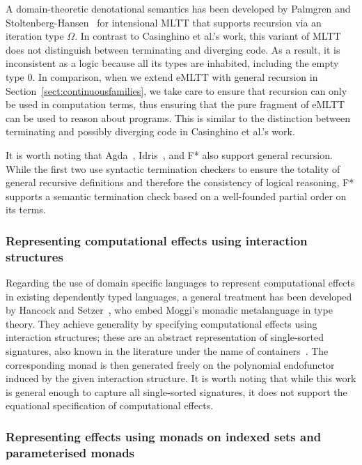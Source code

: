 A domain-theoretic denotational semantics has been developed by Palmgren and Stoltenberg-Hansen~\cite{Palmgren:DomainInterpretation} for intensional MLTT that supports recursion via an iteration type $\Omega$. In contrast to Casinghino et al.'s work, this variant of MLTT  does not distinguish between terminating and diverging code. As a result, it is inconsistent as a logic because all its types are inhabited, including the empty type $0$.
% 
In comparison, when we extend eMLTT with general recursion in Section~\ref{sect:continuousfamilies}, 
we take care to ensure that recursion can only be used in computation terms, thus ensuring that the pure fragment of eMLTT can be used to reason about programs. This is similar to the distinction between terminating and possibly diverging code in Casinghino et al.'s work.

It is worth noting that Agda~\cite{Norell:Thesis}, Idris~\cite{Brady:Idris}, and F* also support general recursion. 
While the first two use syntactic termination checkers to ensure the totality of general recursive definitions and therefore the consistency of logical reasoning, F* supports a semantic termination check based on a well-founded partial order on its terms. 


\subsubsection*{Representing computational effects using interaction structures}

Regarding the use of domain specific languages to represent computational effects in existing dependently typed languages, a general treatment has been developed by Hancock and Setzer~\cite{Hancock:InteractivePrograms}, who embed Moggi's monadic metalanguage in type theory. They achieve generality by specifying computational effects using interaction structures; these are an abstract representation of single-sorted signatures, also known in the literature under the name of containers~\cite{Abbott:Containers}. The corresponding monad is then generated freely on the polynomial endofunctor induced by the given interaction structure. 
%
It is worth noting that while this work is general enough to capture all single-sorted signatures, it does not support the equational specification of computational effects.

\subsubsection*{Representing effects using monads on indexed sets and parameterised monads}

